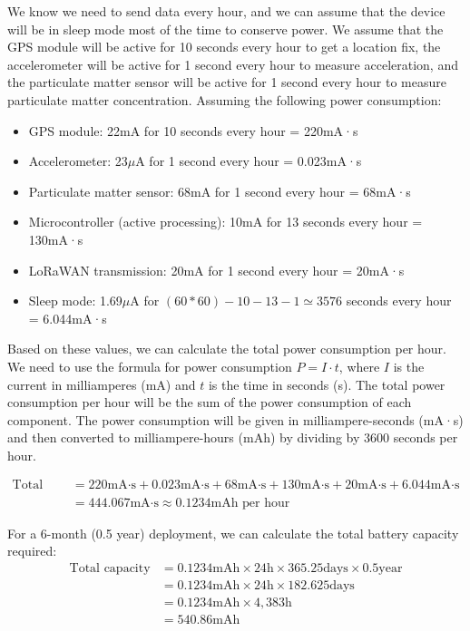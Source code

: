 We know we need to send data every hour, and we can assume that the device will be in sleep mode most of the time to conserve power.
We assume that the GPS module will be active for 10 seconds every hour to get a location fix, the accelerometer will be active for 1 second every hour to measure acceleration, and the particulate matter sensor will be active for 1 second every hour to measure particulate matter concentration.
Assuming the following power consumption:
\begin{itemize}  \item GPS module: 22mA for 10 seconds every hour = 220mA·s
  \item Accelerometer: 23$\mu$A for 1 second every hour = 0.023mA·s
  \item Particulate matter sensor: 68mA for 1 second every hour = 68mA·s
  \item Microcontroller (active processing): 10mA for 13 seconds every hour = 130mA·s
  \item LoRaWAN transmission: 20mA for 1 second every hour = 20mA·s
  \item Sleep mode: 1.69$\mu$A for $(60*60) - 10 - 13 - 1 \simeq 3576$ seconds every hour = 6.044mA·s
\end{itemize}

Based on these values, we can calculate the total power consumption per hour.
We need to use the formula for power consumption $P = I \cdot t$, where $I$ is the current in milliamperes (mA) and $t$ is the time in seconds (s). The total power consumption per hour will be the sum of the power consumption of each component. The power consumption will be given in milliampere-seconds (mA·s) and then converted to milliampere-hours (mAh) by dividing by 3600 seconds per hour.

\begin{align*}
\text{Total per hour} &= 220\text{mA·s} + 0.023\text{mA·s} + 68\text{mA·s} + 130\text{mA·s} + 20\text{mA·s} + 6.044\text{mA·s} \\
&= 444.067\text{mA·s} \approx 0.1234\text{mAh per hour}
\end{align*}

For a 6-month (0.5 year) deployment, we can calculate the total battery capacity required:
\begin{align*}
\text{Total capacity} &= 0.1234\text{mAh} \times 24\text{h} \times 365.25\text{days} \times 0.5\text{year} \\
&= 0.1234\text{mAh} \times 24\text{h} \times 182.625\text{days} \\
&= 0.1234\text{mAh} \times 4,383\text{h} \\
&= 540.86\text{mAh}
\end{align*}


